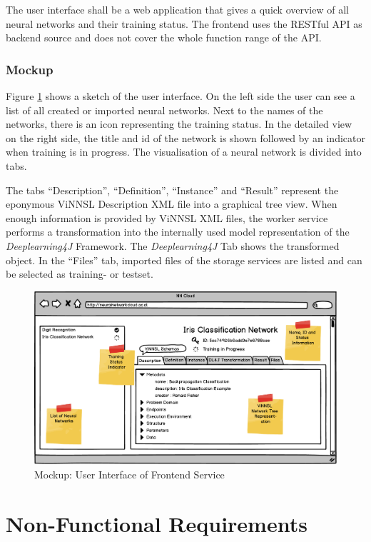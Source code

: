 The user interface shall be a web application that gives a quick
overview of all neural networks and their training status. The frontend
uses the RESTful API as backend source and does not cover the whole
function range of the API.

\subsubsection{Mockup}\label{mockup}

Figure \ref{vinnsl-ui-mockup} shows a sketch of the user interface. On
the left side the user can see a list of all created or imported neural
networks. Next to the names of the networks, there is an icon
representing the training status. In the detailed view on the right
side, the title and id of the network is shown followed by an indicator
when training is in progress. The visualisation of a neural network is
divided into tabs.

The tabs ``Description'', ``Definition'', ``Instance'' and ``Result''
represent the eponymous ViNNSL Description XML file into a graphical
tree view. When enough information is provided by ViNNSL XML files, the
worker service performs a transformation into the internally used model
representation of the \emph{Deeplearning4J} Framework. The
\emph{Deeplearning4J} Tab shows the transformed object. In the ``Files''
tab, imported files of the storage services are listed and can be
selected as training- or testset.

\begin{figure}
\centering
\includegraphics[width=17.00000cm]{./images/vinnsl-ui-mockup}
\caption{Mockup: User Interface of Frontend
Service\label{vinnsl-ui-mockup}}
\end{figure}

\section{Non-Functional Requirements}\label{non-functional-requirements}


